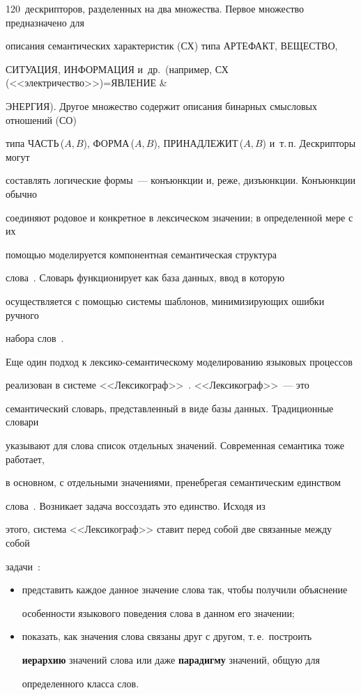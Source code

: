 120~дескрипторов, разделенных на два множества. Первое множество предназначено для 


описания семантических характеристик (СХ) типа АРТЕФАКТ, ВЕЩЕСТВО, 


СИТУАЦИЯ, ИНФОРМАЦИЯ и~др.\ (например, СХ (<<электричество>>)\;=\;ЯВЛЕНИЕ \& 


ЭНЕРГИЯ). Другое множество содержит описания бинарных смысловых отношений (СО) 


типа ЧАСТЬ\,($A,B$), ФОРМА\,($A,B$), ПРИНАДЛЕЖИТ\,($A,B$) и~т.\,п. Дескрипторы могут 


составлять логические формы~--- конъюнкции и, реже, дизъюнкции. Конъюнкции обычно 


соединяют родовое и конкретное в лексическом значении; в определенной мере с их 


по\-мощью моделируется компонентная семантическая структура 


   слова~\cite{2-2-11, 4-2-11}. Словарь функционирует как база данных, ввод в которую 


осуществляется с помощью системы шаблонов, минимизирующих ошибки ручного 


набора слов~\cite{4-2-11}.


   


   Еще один подход к лексико-семантическому моделированию языковых процессов 


реализован в системе <<Лексикограф>>~\cite{5-2-11}. <<Лексикограф>>~--- это 


семантический словарь, представленный в виде базы данных. Традиционные словари 


указывают для слова список отдельных значений. Современная семантика тоже работает, 


в основном, с отдельными значениями, пренебрегая семантическим единством 


   слова~\cite{6-2-11, 7-2-11}. Возникает задача воссоздать это единство. Исходя из 


этого, система <<Лексикограф>> ставит перед собой две связанные между собой 


задачи~\cite{8-2-11}: 


   \begin{itemize}


\item представить каждое данное значение слова так, чтобы получили объяснение 


особенности языкового поведения слова в данном его значении; 


\item показать, как значения слова связаны друг с другом, т.\,е.\ построить 


\textbf{иерархию} значений слова или даже \textbf{парадигму} значений, общую для 


определенного класса слов.


\end{itemize}





